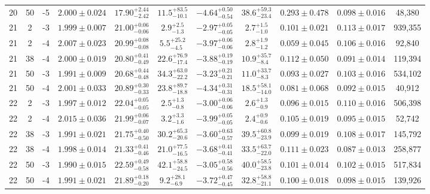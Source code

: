 \documentclass{aa}
\begin{document}
\begin{table}
\begin{tabular}{lcccccccccc}
        20 & 50 & -5 & $2.000 \pm 0.024$ & $17.90^{+2.44}_{-2.42}$ & $11.5^{+83.5}_{-10.1}$ & $-4.64^{+0.50}_{-0.54}$ & $38.6^{+59.3}_{-23.4}$ & $0.293 \pm 0.478$ & $0.098 \pm 0.016$ & 48,380 \\
        21 & 2 & -3 & $1.999 \pm 0.007$ & $21.00^{+0.06}_{-0.06}$ & $2.9^{+2.5}_{-1.3}$ & $-2.97^{+0.05}_{-0.05}$ & $2.7^{+1.5}_{-1.0}$ & $0.101 \pm 0.021$ & $0.113 \pm 0.017$ & 939,355 \\
        21 & 2 & -4 & $2.007 \pm 0.023$ & $20.99^{+0.08}_{-0.08}$ & $5.5^{+25.2}_{-4.5}$ & $-3.97^{+0.06}_{-0.06}$ & $2.8^{+1.9}_{-1.2}$ & $0.059 \pm 0.045$ & $0.106 \pm 0.016$ & 92,840 \\
        21 & 38 & -4 & $2.000 \pm 0.019$ & $20.80^{+0.41}_{-0.49}$ & $22.6^{+76.9}_{-17.4}$ & $-3.88^{+0.19}_{-0.19}$ & $10.9^{+35.7}_{-8.4}$ & $0.112 \pm 0.050$ & $0.091 \pm 0.014$ & 119,394 \\
        21 & 50 & -3 & $1.991 \pm 0.009$ & $20.68^{+0.44}_{-0.48}$ & $34.3^{+63.0}_{-22.2}$ & $-3.23^{+0.21}_{-0.21}$ & $11.0^{+33.7}_{-8.3}$ & $0.093 \pm 0.027$ & $0.103 \pm 0.016$ & 534,102 \\
        21 & 50 & -4 & $2.001 \pm 0.033$ & $20.89^{+0.30}_{-0.33}$ & $23.8^{+89.7}_{-18.8}$ & $-4.34^{+0.31}_{-0.31}$ & $18.5^{+58.1}_{-14.0}$ & $0.081 \pm 0.068$ & $0.092 \pm 0.015$ & 40,912 \\
        22 & 2 & -3 & $1.997 \pm 0.012$ & $22.04^{+0.05}_{-0.05}$ & $2.5^{+1.3}_{-0.8}$ & $-3.00^{+0.06}_{-0.06}$ & $2.6^{+1.3}_{-0.9}$ & $0.096 \pm 0.015$ & $0.110 \pm 0.016$ & 506,398 \\
        22 & 2 & -4 & $2.015 \pm 0.036$ & $21.99^{+0.06}_{-0.07}$ & $3.2^{+3.3}_{-1.6}$ & $-3.99^{+0.05}_{-0.05}$ & $2.4^{+0.9}_{-0.6}$ & $0.105 \pm 0.019$ & $0.095 \pm 0.015$ & 52,742 \\
        22 & 38 & -3 & $1.991 \pm 0.021$ & $21.75^{+0.40}_{-0.50}$ & $30.2^{+65.3}_{-20.6}$ & $-3.60^{+0.63}_{-0.57}$ & $39.5^{+60.8}_{-23.9}$ & $0.099 \pm 0.019$ & $0.108 \pm 0.017$ & 145,792 \\
        22 & 38 & -4 & $1.998 \pm 0.014$ & $21.33^{+0.41}_{-0.46}$ & $21.0^{+77.5}_{-16.5}$ & $-3.68^{+0.41}_{-0.41}$ & $33.5^{+63.7}_{-22.0}$ & $0.111 \pm 0.023$ & $0.087 \pm 0.013$ & 258,877 \\
        22 & 50 & -3 & $1.990 \pm 0.015$ & $22.59^{+0.49}_{-0.58}$ & $42.1^{+58.8}_{-24.5}$ & $-3.05^{+0.58}_{-0.56}$ & $40.0^{+58.5}_{-23.8}$ & $0.101 \pm 0.014$ & $0.102 \pm 0.015$ & 517,834 \\
        22 & 50 & -4 & $1.991 \pm 0.021$ & $21.89^{+0.18}_{-0.20}$ & $9.2^{+28.1}_{-6.9}$ & $-3.72^{+0.47}_{-0.45}$ & $32.8^{+58.8}_{-21.1}$ & $0.100 \pm 0.018$ & $0.098 \pm 0.015$ & 139,926 \\

\end{tabular}
\end{table}
\end{document}
